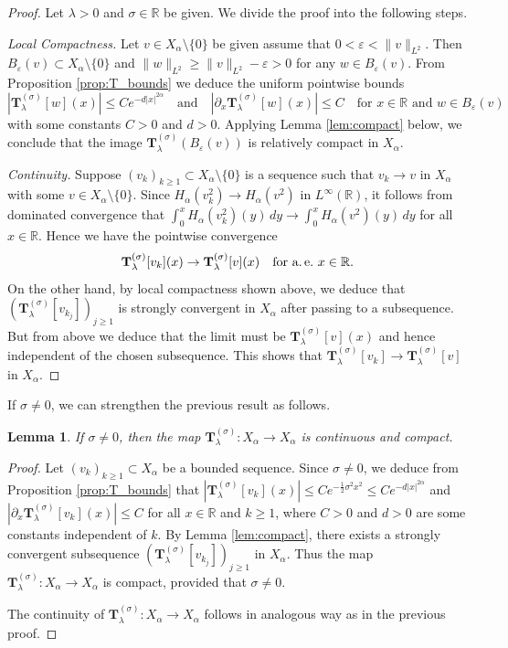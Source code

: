 \documentclass[reqno,10pt,a4paper]{amsart}
\newtheorem{lem}{Lemma}[section]
\theoremstyle{definition}
\theoremstyle{definition}
\theoremstyle{remark}
\theoremstyle{remark}
\numberwithin{equation}{section}
\newcommand{\R}{\mathbb{R}}
\newcommand{\pt}{\partial}
\newcommand{\eps}{\varepsilon}
\newcommand{\Tss}{\mathbf{T}^{(\sigma)}_\lambda}
\begin{document}
\begin{proof}
Let $\lambda > 0$ and $\sigma \in \R$ be given. We divide the proof into the following steps.

\medskip
{\em Local Compactness.} Let $v \in X_\alpha \setminus \{ 0 \}$ be given assume that $0 < \eps < \| v \|_{L^2}$. Then $B_\eps(v) \subset X_\alpha \setminus \{ 0 \}$ and $\| w \|_{L^2} \geq \| v \|_{L^2} - \eps > 0$ for any $w \in B_\eps(v)$. From Proposition \ref{prop:T_bounds} we deduce the uniform pointwise bounds
$$
|\Tss[w](x)| \leq C e^{-d |x|^{2 \alpha}} \quad \mbox{and} \quad |\pt_x \Tss[w](x)| \leq C \quad \mbox{for $x \in \R$ and $w \in B_\eps(v)$}
$$
with some constants $C>0$ and $d > 0$. Applying Lemma \ref{lem:compact} below, we conclude that the image $\Tss(B_\eps(v))$ is relatively compact in $X_\alpha$.

\medskip
{\em Continuity.} Suppose $(v_k)_{k \geq 1} \subset X_\alpha \setminus \{ 0 \}$ is a sequence such that $v_k \to v$ in $X_\alpha$ with some $v \in X_\alpha \setminus \{ 0 \}$. Since $H_\alpha(v_k^2) \to H_\alpha(v^2)$ in $L^\infty(\R)$, it follows from dominated convergence that $\int_0^x H_\alpha(v_k^2)(y) \, dy \to \int_0^x H_\alpha(v^2)(y) \, dy$ for all $x \in \R$. Hence we have the pointwise convergence
$$
\Tss[v_k](x) \to \Tss[v](x) \quad \mbox{for a.\,e.~$x \in \R$}.
$$
On the other hand, by local compactness shown above, we deduce that $(\Tss[v_{k_j}])_{j \geq 1}$ is strongly convergent in $X_\alpha$ after passing to a subsequence. But from above we deduce that the limit must be $\Tss[v](x)$ and hence independent of the chosen subsequence. This shows that $\Tss[v_k] \to \Tss[v]$ in $X_\alpha$.
\end{proof}

If $\sigma \neq 0$, we can strengthen the previous result as follows.

\begin{lem}
If $\sigma \neq 0$, then the map $\Tss : X_\alpha \to X_\alpha$ is continuous and compact.
\end{lem}

\begin{proof}
Let $(v_k)_{k \geq 1} \subset X_\alpha$ be a bounded sequence. Since $\sigma \neq 0$, we deduce from Proposition \ref{prop:T_bounds} that $| \Tss[v_k](x)| \leq C e^{-\frac{1}{2} \sigma^2 x^2} \leq C e^{-d |x|^{2 \alpha}}$ and $|\pt_x \Tss[v_k](x)| \leq C$ for all $x \in \R$ and $k \geq 1$, where $C>0$ and $d > 0$ are some constants independent of $k$. By Lemma \ref{lem:compact}, there exists a strongly convergent subsequence $(\Tss[v_{k_j}])_{j \geq 1}$ in $X_\alpha$. Thus the map $\Tss : X_\alpha \to X_\alpha$ is compact, provided that $\sigma \neq 0$.

The continuity of $\Tss : X_\alpha \to X_\alpha$ follows in analogous way as in the previous proof.
\end{proof}
\end{document}

